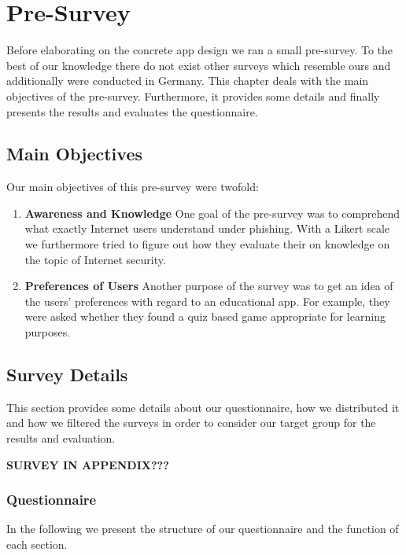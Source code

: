 \section{Pre-Survey}
\label{s:prestudy}
Before elaborating on the concrete app design we ran a small pre-survey.
 To the best of our knowledge there do not exist other surveys which resemble ours and additionally were conducted in Germany.
 This chapter deals with the main objectives of the pre-survey.
 Furthermore, it provides some details and finally presents the results and evaluates the questionnaire.


\subsection{Main Objectives}
Our main objectives of this pre-survey were twofold:

\begin{enumerate}
	\item \textbf{Awareness and Knowledge} One goal of the pre-survey was to comprehend what exactly Internet users understand under phishing.
 With a Likert scale we furthermore tried to figure out how they evaluate their on knowledge on the topic of Internet security.

	\item \textbf{Preferences of Users} Another purpose of the survey was to get an idea of the users' preferences with regard to an educational app.
 For example, they were asked whether they found a quiz based game appropriate for learning purposes.

\end{enumerate}
\subsection{Survey Details}
This section provides some details about our questionnaire, how we distributed it and how we filtered the surveys in order to consider our target group for the results and evaluation.

\textbf{SURVEY IN APPENDIX???}

\subsubsection{Questionnaire}
In the following we present the structure of our questionnaire and the function of each section.
 
